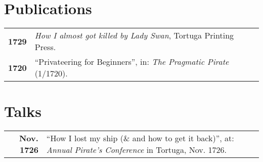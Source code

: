 \documentclass[withoutsidebar]{simplehipstercv}
\newlength{\rightcolwidth}
\begin{document}
\begin{paracol}{2}
\begin{minipage}[t]{0.3\textwidth}
\end{minipage}\hfill
\begin{minipage}[t]{0.3\textwidth}
\section*{Publications}
\begin{tabular}{>{\footnotesize\bfseries}r >{\footnotesize}p{}}
    1729 & \emph{How I almost got killed by Lady Swan}, Tortuga Printing Press. \\
    1720 & ``Privateering for Beginners'', in: \emph{The Pragmatic Pirate} (1/1720).
\end{tabular}
\bigskip

\section*{Talks}
\begin{tabular}{>{\footnotesize\bfseries}r >{\footnotesize}p{}}
    Nov. 1726 & ``How I lost my ship (\& and how to get it back)'', at: \emph{Annual Pirate's Conference} in Tortuga, Nov. 1726.
\end{tabular}
\end{minipage}






\vfill{} %


\end{paracol}
\end{document}
